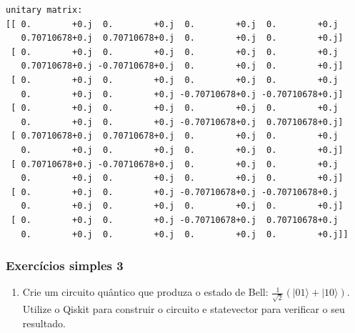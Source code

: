 \documentclass[11pt]{article}
\providecommand{\tightlist}{%
      \setlength{\itemsep}{0pt}\setlength{\parskip}{0pt}}
\begin{document}
    \begin{Verbatim}[commandchars=\\\{\}]
unitary matrix:
[[ 0.        +0.j  0.        +0.j  0.        +0.j  0.        +0.j
   0.70710678+0.j  0.70710678+0.j  0.        +0.j  0.        +0.j]
 [ 0.        +0.j  0.        +0.j  0.        +0.j  0.        +0.j
   0.70710678+0.j -0.70710678+0.j  0.        +0.j  0.        +0.j]
 [ 0.        +0.j  0.        +0.j  0.        +0.j  0.        +0.j
   0.        +0.j  0.        +0.j -0.70710678+0.j -0.70710678+0.j]
 [ 0.        +0.j  0.        +0.j  0.        +0.j  0.        +0.j
   0.        +0.j  0.        +0.j -0.70710678+0.j  0.70710678+0.j]
 [ 0.70710678+0.j  0.70710678+0.j  0.        +0.j  0.        +0.j
   0.        +0.j  0.        +0.j  0.        +0.j  0.        +0.j]
 [ 0.70710678+0.j -0.70710678+0.j  0.        +0.j  0.        +0.j
   0.        +0.j  0.        +0.j  0.        +0.j  0.        +0.j]
 [ 0.        +0.j  0.        +0.j -0.70710678+0.j -0.70710678+0.j
   0.        +0.j  0.        +0.j  0.        +0.j  0.        +0.j]
 [ 0.        +0.j  0.        +0.j -0.70710678+0.j  0.70710678+0.j
   0.        +0.j  0.        +0.j  0.        +0.j  0.        +0.j]]
    \end{Verbatim}

    \hypertarget{exercuxedcios-simples-3}{%
\subsubsection{\texorpdfstring{Exercícios simples 3
}{Exercícios simples 3 }}\label{exercuxedcios-simples-3}}

\begin{enumerate}
\def\labelenumi{\arabic{enumi}.}
\tightlist
\item
  Crie um circuito quântico que produza o estado de Bell:
  \(\tfrac{1}{\sqrt{2}}(|01\rangle + |10\rangle)\). Utilize o Qiskit
  para construir o circuito e statevector para verificar o seu
  resultado.
\end{enumerate}
\end{document}
